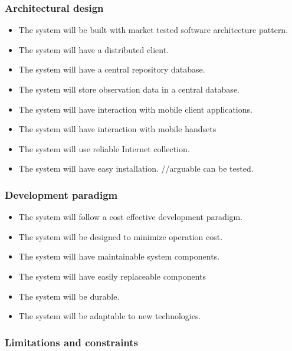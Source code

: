 \subsubsection{Architectural design}
    \begin{itemize}
        \item The system will be built with market tested software architecture pattern.
        \item The system will have a distributed client.
        \item The system will have a central repository database.
        \item The system will store observation data in a central database.
        \item The system will have interaction with mobile client applications.
        \item The system will have interaction with mobile handsets
        \item The system will use reliable Internet collection.
        \item The system will have easy installation. //arguable can be tested.

    \end{itemize}
\subsubsection{Development paradigm}
    \begin{itemize}
        \item The system will follow a cost effective development paradigm.
        \item The system will be designed to minimize operation cost.
        \item The system will have maintainable system components.
        \item The system will have easily replaceable components
        \item The system will be durable.
        \item The system will be adaptable to new technologies.

    \end{itemize}
\subsubsection{Limitations and constraints}
